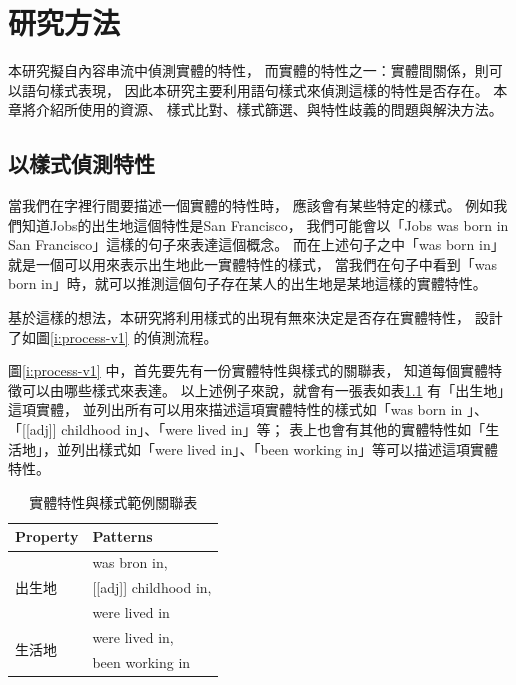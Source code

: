 %
%
%
\chapter{研究方法}
\label{c:method}

本研究擬自內容串流中偵測實體的特性，
而實體的特性之一：實體間關係，則可以語句樣式表現，
因此本研究主要利用語句樣式來偵測這樣的特性是否存在。
本章將介紹所使用的資源、
樣式比對、樣式篩選、與特性歧義的問題與解決方法。

\section{以樣式偵測特性}
當我們在字裡行間要描述一個實體的特性時，
應該會有某些特定的樣式。
例如我們知道Jobs的出生地這個特性是San Francisco，
我們可能會以「Jobs was born in San Francisco」這樣的句子來表達這個概念。
而在上述句子之中「was born in」就是一個可以用來表示出生地此一實體特性的樣式，
當我們在句子中看到「was born in」時，就可以推測這個句子存在某人的出生地是某地這樣的實體特性。

基於這樣的想法，本研究將利用樣式的出現有無來決定是否存在實體特性，
設計了如圖\ref{i:process-v1} 的偵測流程。

圖\ref{i:process-v1} 中，首先要先有一份實體特性與樣式的關聯表，
知道每個實體特徵可以由哪些樣式來表達。
以上述例子來說，就會有一張表如表\ref{t:ext} 有「出生地」這項實體，
並列出所有可以用來描述這項實體特性的樣式如「was born in 」、「[[adj]] childhood in」、「were lived in」等；
表上也會有其他的實體特性如「生活地」，並列出樣式如「were lived in」、「been working in」等可以描述這項實體特性。

\begin{table}
    \centering
    \footnotesize
    \begin{tabular}{|l|l|}
        \hline
        Property & Patterns \\
        \hline
        \multirow{3}{*}{出生地} & was bron in, \\
         & [[adj]] childhood in, \\
         & were lived in\\
        \hline
        \multirow{2}{*}{生活地} & were lived in, \\
         & been working in\\
        \hline
    \end{tabular}
    \caption{實體特性與樣式範例關聯表}
    \label{t:ext}
\end{table}

